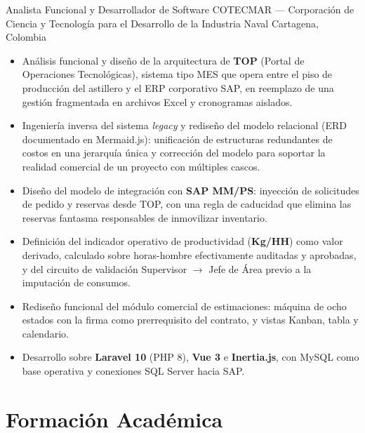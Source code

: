 \documentclass[11pt,a4paper,sans]{moderncv}
\begin{document}
        {Analista Funcional y Desarrollador de Software}
        {COTECMAR — Corporación de Ciencia y Tecnología para el Desarrollo de la Industria Naval}
        {Cartagena, Colombia}{}
{\begin{itemize}
  \item Análisis funcional y diseño de la arquitectura de \textbf{TOP} (Portal de
        Operaciones Tecnológicas), sistema tipo MES que opera entre el piso de
        producción del astillero y el ERP corporativo SAP, en reemplazo de una
        gestión fragmentada en archivos Excel y cronogramas aislados.
  \item Ingeniería inversa del sistema \emph{legacy} y rediseño del modelo relacional
        (ERD documentado en Mermaid.js): unificación de estructuras redundantes de
        costos en una jerarquía única y corrección del modelo para soportar la
        realidad comercial de un proyecto con múltiples cascos.
  \item Diseño del modelo de integración con \textbf{SAP MM/PS}: inyección de
        solicitudes de pedido y reservas desde TOP, con una regla de caducidad que
        elimina las reservas fantasma responsables de inmovilizar inventario.
  \item Definición del indicador operativo de productividad (\textbf{Kg/HH}) como
        valor derivado, calculado sobre horas-hombre efectivamente auditadas y
        aprobadas, y del circuito de validación Supervisor $\rightarrow$ Jefe de Área
        previo a la imputación de consumos.
  \item Rediseño funcional del módulo comercial de estimaciones: máquina de ocho
        estados con la firma como prerrequisito del contrato, y vistas Kanban,
        tabla y calendario.
  \item Desarrollo sobre \textbf{Laravel 10} (PHP 8), \textbf{Vue 3} e
        \textbf{Inertia.js}, con MySQL como base operativa y conexiones SQL Server
        hacia SAP.
\end{itemize}}


\section{Formación Académica}
\end{document}
